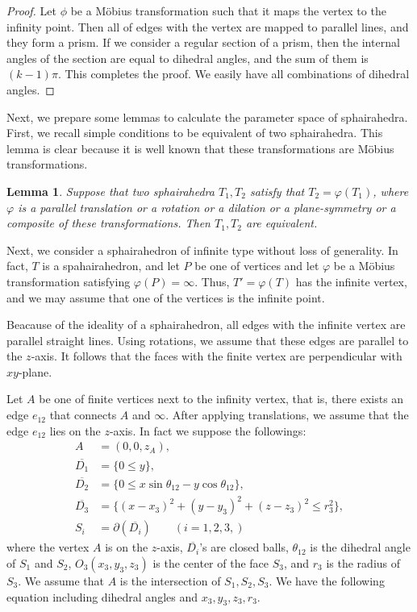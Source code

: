 \documentclass[suppldata, dvipdfmx]{interact}
\theoremstyle{plain}%
\newtheorem{lemma}[theorem]{Lemma}
\theoremstyle{definition}
\theoremstyle{remark}
\theoremstyle{problemstyle}
\begin{document}
\begin{proof}
 Let $\phi$ be a M\"obius transformation such that it maps the vertex to
 the infinity point. Then all of edges with the vertex are mapped to
 parallel lines, and they form a prism. If we consider a
 regular section of a prism, then the internal angles of the section 
 are equal to dihedral angles, and the sum of them is $(k-1)\pi$.  This
 completes the proof.  We easily have all combinations of dihedral angles.
\end{proof}

Next, we prepare some lemmas to calculate the parameter space of sphairahedra. First, we recall simple conditions to be equivalent of two sphairahedra.  This lemma is clear because it is well known that these transformations are M\"obius transformations. 

\begin{lemma}
Suppose that two sphairahedra $T_1, T_2$ satisfy that $T_2=\varphi(T_1)$, where $\varphi$ is a parallel translation or a rotation or a dilation or a plane-symmetry or a composite of these transformations.  Then $T_1, T_2$ are equivalent. 
\end{lemma}

Next, we consider a sphairahedron of infinite type without loss of generality.  In fact, $T$ is a spahairahedron, and  let $P$ be one of vertices and let $\varphi$ be a M\"obius transformation satisfying $\varphi(P)=\infty$.  Thus, $T'=\varphi(T)$ has the infinite vertex, and we may assume that one of the vertices is the infinite point.

Beacause of the ideality of a sphairahedron, all edges with the infinite vertex are parallel straight lines.  Using rotations, we assume that these edges are parallel to the $z$-axis.  It follows that the faces with the finite vertex are perpendicular with $xy$-plane.

Let $A$ be one of finite vertices next to the infinity vertex, that is, there exists an edge $e_{12}$ that connects $A$ and $\infty$.  After applying translations, we assume that the edge $e_{12}$ lies on the $z$-axis.  In fact we suppose the followings:
\begin{align*}
A &= (0,0,z_A),\\ 
\overline{D_1}  &= \{ 0 \le y \} ,\\
\overline{D_2}  &= \{ 0 \le x\sin\theta_{12} - y\cos\theta_{12} \} ,\\
\overline{D_3}  &= \{ (x-x_3)^2+(y-y_3)^2+(z-z_3)^2 \le r_3^2 \}, \\
S_i & = \partial(\overline{D_i}) \qquad(i=1,2,3,)
\end{align*}
where the vertex $A$ is on the $z$-axis, $\overline{D_i}$'s are closed balls, $\theta_{12}$ is the dihedral angle of $S_1$ and $S_2$,  $O_3(x_3, y_3, z_3)$ is the center of the face $S_3$, and $r_3$ is the radius of $S_3$.  We assume that $A$ is the intersection of $S_1, S_2, S_3$.  We have the following equation including dihedral angles and  $x_3, y_3, z_3, r_3$.
\end{document}
